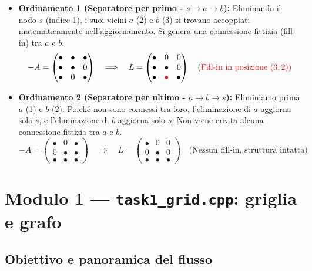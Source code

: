 \documentclass[a4paper,11pt]{article}
\theoremstyle{definition}
\begin{document}
\begin{itemize}
  \item \textbf{Ordinamento 1 (Separatore per primo - $s \to a \to b$):}
  Eliminando il nodo $s$ (indice 1), i suoi vicini $a$ (2) e $b$ (3) si trovano accoppiati matematicamente nell'aggiornamento. Si genera una connessione fittizia (fill-in) tra $a$ e $b$.
  \[
    -A = \begin{pmatrix} \bullet & \bullet & \bullet \\ \bullet & \bullet & 0 \\ \bullet & 0 & \bullet \end{pmatrix} 
    \quad\Longrightarrow\quad 
    L = \begin{pmatrix} \bullet & 0 & 0 \\ \bullet & \bullet & 0 \\ \bullet & \color{red}{\bullet} & \bullet \end{pmatrix} 
    \quad \text{(\color{red}{Fill-in} in posizione $(3,2)$)}
  \]

  \item \textbf{Ordinamento 2 (Separatore per ultimo - $a \to b \to s$):}
  Eliminiamo prima $a$ (1) e $b$ (2). Poiché non sono connessi tra loro, l'eliminazione di $a$ aggiorna solo $s$, e l'eliminazione di $b$ aggiorna solo $s$. Non viene creata alcuna connessione fittizia tra $a$ e $b$.
  \[
    -A = \begin{pmatrix} \bullet & 0 & \bullet \\ 0 & \bullet & \bullet \\ \bullet & \bullet & \bullet \end{pmatrix} 
    \quad\Longrightarrow\quad 
    L = \begin{pmatrix} \bullet & 0 & 0 \\ 0 & \bullet & 0 \\ \bullet & \bullet & \bullet \end{pmatrix} 
    \quad \text{(Nessun fill-in, struttura intatta)}
  \]
\end{itemize}



\newpage
\section{Modulo 1 — \texttt{task1\_grid.cpp}: griglia e grafo}

\subsection{Obiettivo e panoramica del flusso}
\end{document}
